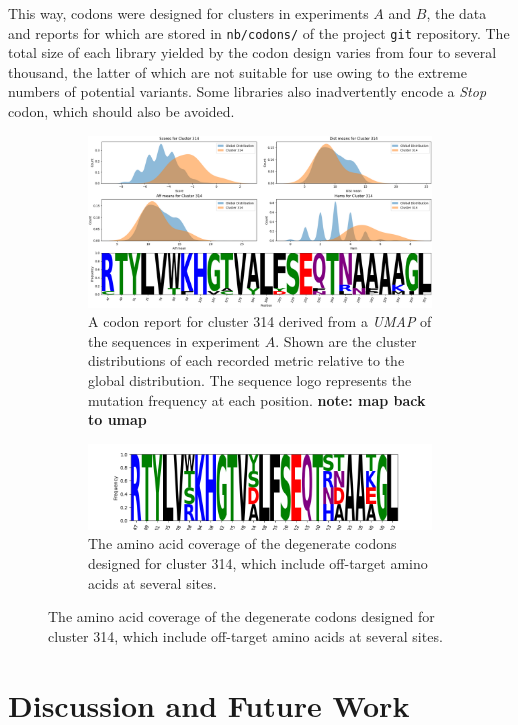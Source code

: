 \documentclass[16pt]{book}
\begin{document}
This way, codons were designed for clusters in experiments $A$ and $B$, the data and reports for which are stored in \texttt{nb/codons/} of the project \texttt{git}  repository.
The total size of each library yielded by the codon design varies from four to several thousand, the latter of which are not suitable for use owing to the extreme numbers of potential variants.
Some libraries also inadvertently encode a \textit{Stop} codon, which should also be avoided.


\begin{figure}
\begin{subfigure}{\textwidth}
	\includegraphics[width=\textwidth]{img/clus_314.png}
	\caption{\label{cdxreport} A codon report for cluster 314 derived from a \textit{UMAP} of the sequences in experiment $A$.
		 Shown are the cluster distributions of each recorded metric relative to the global distribution.
		 The sequence logo represents the mutation frequency at each position. \textbf{note: map back to umap}}
\end{subfigure}
\begin{subfigure}{\textwidth}
	\includegraphics[width=\textwidth]{img/clus_314-codon-coverage.png}
	\caption{\label{cdxreportcoverage} The amino acid coverage of the degenerate codons designed for cluster 314, which include off-target amino acids at several sites.}
\end{subfigure}
\end{figure}

\section{Discussion and Future Work}
\end{document}
